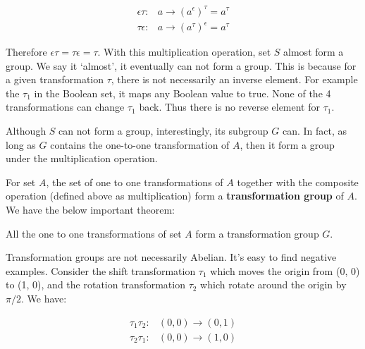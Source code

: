 \documentclass{article}
\begin{document}
\[
\begin{array}{rl}
\epsilon\tau: & a \to (a^\epsilon)^\tau = a^\tau \\
\tau\epsilon: & a \to (a^\tau)^\epsilon = a^\tau
\end{array}
\]

Therefore $\epsilon\tau = \tau\epsilon = \tau$. With this multiplication operation, set $S$ almost form a group. We say it `almost', it eventually can not form a group. This is because for a given transformation $\tau$, there is not necessarily an inverse element. For example the $\tau_1$ in the Boolean set, it maps any Boolean value to true. None of the 4 transformations can change $\tau_1$ back. Thus there is no reverse element for $\tau_1$.

Although $S$ can not form a group, interestingly, its subgroup $G$ can. In fact, as long as $G$ contains the one-to-one transformation of $A$, then it form a group under the multiplication operation.


For set $A$, the set of one to one transformations of $A$ together with the composite operation (defined above as multiplication) form a \textbf{transformation group} of $A$. We have the below important theorem:

\begin{theorem}
All the one to one transformations of set $A$ form a transformation group $G$.
\end{theorem}

Transformation groups are not necessarily Abelian. It's easy to find negative examples. Consider the shift transformation $\tau_1$ which moves the origin from (0, 0) to (1, 0), and the rotation transformation $\tau_2$ which rotate around the origin by $\pi/2$. We have:

\[
\begin{array}{rl}
\tau_1\tau_2: & (0, 0) \to (0, 1) \\
\tau_2\tau_1: & (0, 0) \to (1, 0)
\end{array}
\]
\end{document}
